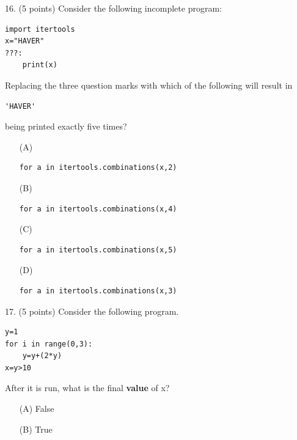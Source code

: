 \documentclass{article}
\newcounter{question}
\begin{document}
\noindent
\begin{minipage}{\textwidth}
16. (5 points)
Consider the following incomplete program:
\begin{verbatim}
import itertools
x="HAVER"
???:
    print(x)
\end{verbatim}
Replacing the three question marks with which of the following will result in \begin{verbatim}'HAVER'\end{verbatim} being printed exactly five times?

\begin{enumerate}
\item[(A)]
\begin{verbatim}
for a in itertools.combinations(x,2)
\end{verbatim}

\item[(B)]
\begin{verbatim}
for a in itertools.combinations(x,4)
\end{verbatim}

\item[(C)]
\begin{verbatim}
for a in itertools.combinations(x,5)
\end{verbatim}

\item[(D)]
\begin{verbatim}
for a in itertools.combinations(x,3)
\end{verbatim}

\end{enumerate}
\end{minipage}
\vspace{10em}
\filbreak\vfil{}\vfilneg

\noindent
\begin{minipage}{\textwidth}
17. (5 points)
Consider the following program.
\begin{verbatim}
y=1
for i in range(0,3):
    y=y+(2*y)
x=y>10
\end{verbatim}
After it is run, what is the final \textbf{value} of x?

\begin{enumerate}
\item[(A)]
False

\item[(B)]
True

\end{enumerate}
\end{minipage}
\vspace{10em}
\filbreak\vfil{}\vfilneg
\end{document}
